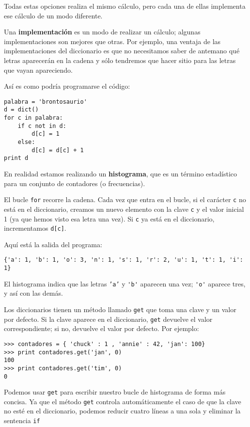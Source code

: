 Todas estas opciones realiza el mismo cálculo, pero cada
una de ellas implementa ese cálculo de un modo diferente.


Una {\bf implementación} es un modo de realizar un cálculo;
algunas implementaciones son mejores que otras. Por ejemplo,
una ventaja de las implementaciones del diccionario es que no
necesitamos saber de antemano qué letras aparecerán en la cadena
y sólo tendremos que hacer sitio para las letras que vayan apareciendo.

Así es como podría programarse el código:

\beforeverb
\begin{verbatim}
palabra = 'brontosaurio'
d = dict()
for c in palabra:
    if c not in d:
        d[c] = 1
    else:
        d[c] = d[c] + 1
print d
\end{verbatim}
\afterverb
%
En realidad estamos realizando un {\bf histograma}, que es un término
estadístico para un conjunto de contadores (o frecuencias).


El bucle {\tt for} recorre
la cadena. Cada vez que entra en el bucle, si el carácter {\tt c} no
está en el diccionario, creamos un nuevo elemento con la clave {\tt c} y el
valor inicial 1 (ya que hemos visto esa letra una vez). Si {\tt c} ya
está en el diccionario, incrementamos {\tt d[c]}.


Aquí está la salida del programa:

\beforeverb
\begin{verbatim}
{'a': 1, 'b': 1, 'o': 3, 'n': 1, 's': 1, 'r': 2, 'u': 1, 't': 1, 'i': 1}
\end{verbatim}
\afterverb
%
El histograma indica que las letras {\tt 'a'} y \verb"'b'"
aparecen una vez;  \verb"'o'" aparece tres, y así con las demás.


Los diccionarios tienen un método llamado {\tt get} que toma una clave
y un valor por defecto. Si la clave aparece en el diccionario,
{\tt get} devuelve el valor correspondiente; si no, devuelve
el valor por defecto. Por ejemplo:

\beforeverb
\begin{verbatim}
>>> contadores = { 'chuck' : 1 , 'annie' : 42, 'jan': 100}
>>> print contadores.get('jan', 0)
100
>>> print contadores.get('tim', 0)
0
\end{verbatim}
\afterverb
%
Podemos usar {\tt get} para escribir nuestro bucle de histograma de forma más concisa.
Ya que el método {\tt get} controla automáticamente el caso de que la clave
no esté en el diccionario, podemos reducir cuatro líneas a una sola
y eliminar la sentencia {\tt if}

